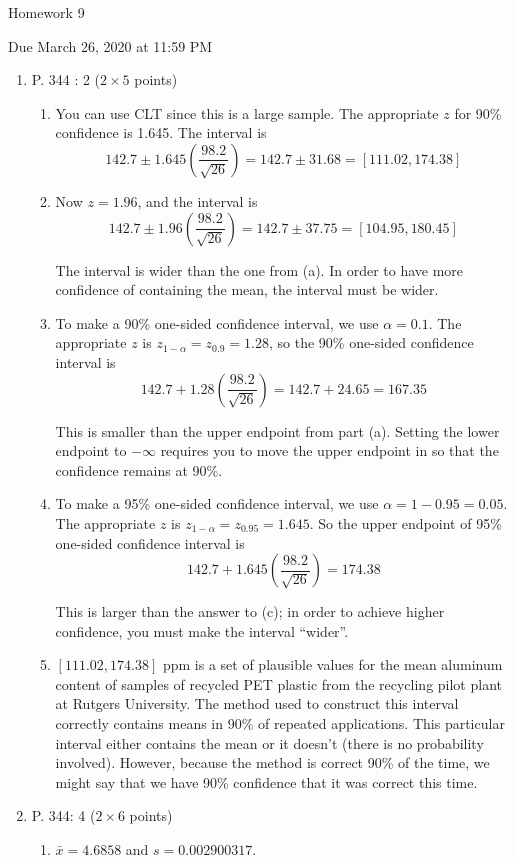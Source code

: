 \documentclass{article}\usepackage[]{graphicx}\usepackage[]{color}
\begin{document}
\begin{center} \LARGE
Homework 9
\end{center}
\begin{center} \Large
Due March 26, 2020 at 11:59 PM 
\end{center}



\begin{enumerate}
	
	\item P. 344 : 2 ($2 \times 5$ points)
  \begin{enumerate}
  \item
  You can use CLT since this is a large sample. The appropriate $z$ for 90\% confidence is 1.645. The interval is 
  \[142.7 \pm 1.645 \left(\frac{98.2}{\sqrt{26}}\right) = 142.7 \pm 31.68 = [111.02 , 174.38]\]
  
  \item 
  Now $z = 1.96$, and the interval is 
  \[142.7 \pm 1.96 \left(\frac{98.2}{\sqrt{26}}\right) = 142.7 \pm 37.75 = [104.95, 180.45]\]
  
  The interval is wider than the one from (a). In order to have more confidence of containing the mean, the interval must be wider.
  
  \item
  To make a 90\% one-sided confidence interval, we use $\alpha = 0.1$. The appropriate $z$ is $z_{1 - \alpha} = z_{0.9} = 1.28$, so the 90\% one-sided confidence interval is 
  \[142.7 + 1.28 \left(\frac{98.2}{\sqrt{26}}\right) = 142.7 + 24.65 = 167.35\]
  
  This is smaller than the upper endpoint from part (a). Setting the lower endpoint to $-\infty$ requires you to move the upper endpoint in so that the confidence remains at 90\%.
  
  \item
  To make a 95\% one-sided confidence interval, we use $\alpha = 1 - 0.95 = 0.05$. The appropriate $z$ is $z_{1 - \alpha} = z_{0.95} = 1.645$. So the upper endpoint of 95\% one-sided confidence interval is
  \[142.7 + 1.645 \left(\frac{98.2}{\sqrt{26}}\right) = 174.38\]
  
  This is larger than the answer to (c); in order to achieve higher confidence, you must make the interval ``wider''.
  
  \item $[111.02, 174.38]$ ppm is a set of plausible values for the mean aluminum content of samples of recycled PET plastic from the recycling pilot plant at Rutgers University. The method used to construct this interval correctly contains means in 90\% of repeated applications. This particular interval either contains the mean or it doesn't (there is no probability involved). However, because the method is correct 90\% of the time, we might say that we have 90\% confidence that it was correct this time. 
  \end{enumerate}
	\item P. 344: 4 ($2 \times 6$ points)
	\begin{enumerate}
	\item $\bar{x} = 4.6858$ and $s = 0.002900317$.
	

\end{enumerate}
\end{enumerate}
\end{document}

